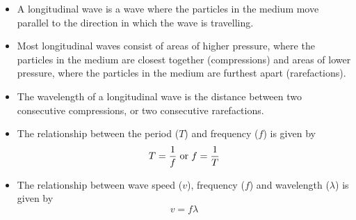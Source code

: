     \noindent
  \label{m38782**end}
                   \label{m38783*cid8}
            \nopagebreak
      \label{m38783*id293550}\begin{itemize}[noitemsep] 
            \label{m38783*uid20}\item A longitudinal wave is a wave where the particles in the medium move parallel to the direction in which the wave is travelling.
\label{m38783*uid21}\item Most longitudinal waves consist of areas of higher pressure, where the particles in the medium are closest together (compressions) and areas of lower pressure, where the particles in the medium are furthest apart (rarefactions).
\label{m38783*uid22}\item The wavelength of a longitudinal wave is the distance between two consecutive compressions, or two consecutive rarefactions.
\label{m38783*uid23}\item The relationship between the period ($T$) and frequency ($f$) is given by
\label{m38783*id293619}\nopagebreak\noindent{}
    \begin{equation*}\nonumber
    T=\frac{1}{f}\phantom{\rule{3pt}{0ex}}\text{or}\phantom{\rule{3pt}{0ex}}f=\frac{1}{T}
      \end{equation*}
    \label{m38783*uid24}\item The relationship between wave speed ($v$), frequency ($f$) and wavelength ($\lambda $) is given by
\label{m38783*id293694}\nopagebreak\noindent{}
    \begin{equation*}\nonumber
    v=f\lambda
      \end{equation*}
\end{itemize}
